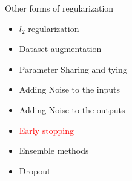 \begin{frame}
\end{frame}

\begin{frame}
	\vspace{4em}
	\begin{overlayarea}{\textwidth}{\textheight}
		\begin{block}{Other forms of regularization}
			\begin{itemize}
				\item $l_2$ regularization
				\item Dataset augmentation
				\item Parameter Sharing and tying
				\item Adding Noise to the inputs
				\item Adding Noise to the outputs 
				\item \textcolor<2->{red}{Early stopping}
				\item Ensemble methods
				\item Dropout
			\end{itemize}
		\end{block}
	\end{overlayarea}
\end{frame}


